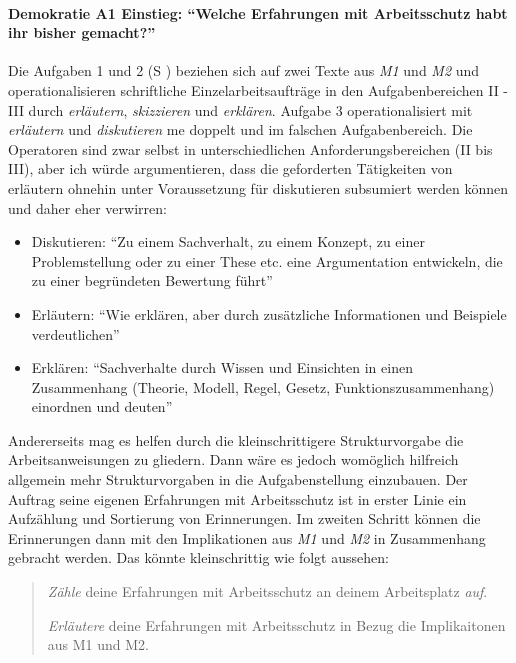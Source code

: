 \paragraph{Demokratie A1 Einstieg: \enquote{Welche Erfahrungen mit Arbeitsschutz habt ihr bisher gemacht?}}

Die Aufgaben 1 und 2 (\gls{S} \pageref{DEMOKRATIE-A1}) beziehen sich auf zwei Texte aus \emph{M1} und \emph{M2} und operationalisieren schriftliche Einzelarbeitsaufträge in den Aufgabenbereichen II - III durch \emph{erläutern}, \emph{skizzieren} und \emph{erklären}.
Aufgabe 3 operationalisiert mit \emph{erläutern} und \emph{diskutieren} \gls{me} doppelt und im falschen Aufgabenbereich. Die Operatoren sind zwar selbst in unterschiedlichen Anforderungsbereichen (II bis III), aber ich würde argumentieren, dass die geforderten Tätigkeiten von erläutern ohnehin unter Voraussetzung für diskutieren subsumiert werden können und daher eher verwirren:
\begin{itemize}
    \item Diskutieren: \enquote{Zu einem Sachverhalt, zu einem Konzept, zu einer Problemstellung oder zu einer These etc. eine Argumentation entwickeln, die zu einer begründeten Bewertung führt} 
    \item Erläutern: \enquote{Wie erklären, aber durch zusätzliche Informationen und Beispiele verdeutlichen}
    \item Erklären: \enquote{Sachverhalte durch Wissen und Einsichten in einen Zusammenhang (Theorie, Modell, Regel, Gesetz, Funktionszusammenhang) einordnen und deuten} 

    \autocite[][13-14]{lower2008}
\end{itemize}
Andererseits mag es helfen durch die kleinschrittigere Strukturvorgabe die Arbeitsanweisungen zu gliedern. Dann wäre es jedoch womöglich hilfreich allgemein mehr Strukturvorgaben in die Aufgabenstellung einzubauen. Der Auftrag seine eigenen Erfahrungen mit Arbeitsschutz ist in erster Linie ein Aufzählung und Sortierung von Erinnerungen. Im zweiten Schritt können die Erinnerungen dann mit den Implikationen aus \emph{M1} und \emph{M2} in Zusammenhang gebracht werden. 
Das könnte kleinschrittig wie folgt aussehen:
\begin{quote}
    \emph{Zähle} deine Erfahrungen mit Arbeitsschutz an deinem Arbeitsplatz \emph{auf}.

    \emph{Erläutere} deine Erfahrungen mit Arbeitsschutz in Bezug die Implikaitonen aus M1 und M2. 
\end{quote}

